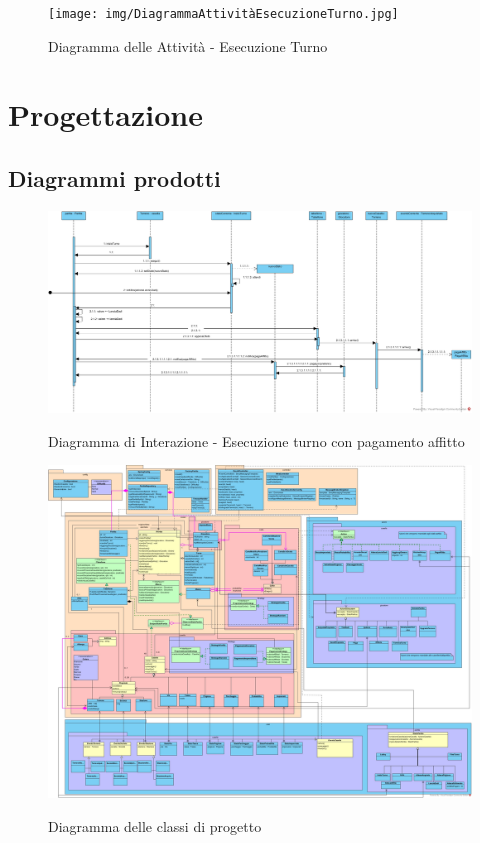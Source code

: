 \documentclass{article}
\begin{document}
\begin{figure}[H]
\centering
\texttt{[image: img/DiagrammaAttivitàEsecuzioneTurno.jpg]}
\caption{Diagramma delle Attività - Esecuzione Turno}
\end{figure}



\section{Progettazione}
\subsection{Diagrammi prodotti}
\begin{figure}[H]
\centering
\href{https://github.com/UnimibSoftEngCourse2022/progetto-monopoly-1-gangoffour2/blob/feat/doc/doc/img/DiagrammaDiSequenzaDiProgettazioneTurnoGiocatore.jpg?raw=true}
	{\includegraphics[width=\textwidth]{DiagrammaDiSequenzaDiProgettazioneTurnoGiocatore}}
\caption{Diagramma di Interazione - Esecuzione turno con pagamento affitto}
\end{figure}

\begin{figure}[H]
\centering
\href{https://github.com/UnimibSoftEngCourse2022/progetto-monopoly-1-gangoffour2/blob/feat/doc/doc/img/DiagrammaDelleClassi.jpg?raw=true}
	{\includegraphics[width=\textwidth]{img/DiagrammaDelleClassi.jpg}}
\caption{Diagramma delle classi di progetto}
\end{figure}
\end{document}
